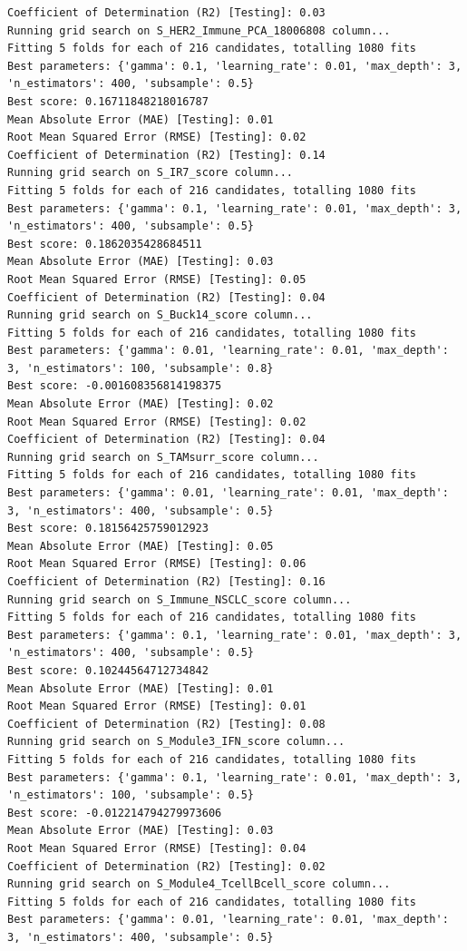 \documentclass[
  letterpaper,
  DIV=11,
  numbers=noendperiod]{scrartcl}
\begin{document}
\begin{verbatim}
Coefficient of Determination (R2) [Testing]: 0.03
Running grid search on S_HER2_Immune_PCA_18006808 column...
Fitting 5 folds for each of 216 candidates, totalling 1080 fits
Best parameters: {'gamma': 0.1, 'learning_rate': 0.01, 'max_depth': 3, 'n_estimators': 400, 'subsample': 0.5}
Best score: 0.16711848218016787
Mean Absolute Error (MAE) [Testing]: 0.01
Root Mean Squared Error (RMSE) [Testing]: 0.02
Coefficient of Determination (R2) [Testing]: 0.14
Running grid search on S_IR7_score column...
Fitting 5 folds for each of 216 candidates, totalling 1080 fits
Best parameters: {'gamma': 0.1, 'learning_rate': 0.01, 'max_depth': 3, 'n_estimators': 400, 'subsample': 0.5}
Best score: 0.1862035428684511
Mean Absolute Error (MAE) [Testing]: 0.03
Root Mean Squared Error (RMSE) [Testing]: 0.05
Coefficient of Determination (R2) [Testing]: 0.04
Running grid search on S_Buck14_score column...
Fitting 5 folds for each of 216 candidates, totalling 1080 fits
Best parameters: {'gamma': 0.01, 'learning_rate': 0.01, 'max_depth': 3, 'n_estimators': 100, 'subsample': 0.8}
Best score: -0.001608356814198375
Mean Absolute Error (MAE) [Testing]: 0.02
Root Mean Squared Error (RMSE) [Testing]: 0.02
Coefficient of Determination (R2) [Testing]: 0.04
Running grid search on S_TAMsurr_score column...
Fitting 5 folds for each of 216 candidates, totalling 1080 fits
Best parameters: {'gamma': 0.01, 'learning_rate': 0.01, 'max_depth': 3, 'n_estimators': 400, 'subsample': 0.5}
Best score: 0.18156425759012923
Mean Absolute Error (MAE) [Testing]: 0.05
Root Mean Squared Error (RMSE) [Testing]: 0.06
Coefficient of Determination (R2) [Testing]: 0.16
Running grid search on S_Immune_NSCLC_score column...
Fitting 5 folds for each of 216 candidates, totalling 1080 fits
Best parameters: {'gamma': 0.1, 'learning_rate': 0.01, 'max_depth': 3, 'n_estimators': 400, 'subsample': 0.5}
Best score: 0.10244564712734842
Mean Absolute Error (MAE) [Testing]: 0.01
Root Mean Squared Error (RMSE) [Testing]: 0.01
Coefficient of Determination (R2) [Testing]: 0.08
Running grid search on S_Module3_IFN_score column...
Fitting 5 folds for each of 216 candidates, totalling 1080 fits
Best parameters: {'gamma': 0.1, 'learning_rate': 0.01, 'max_depth': 3, 'n_estimators': 100, 'subsample': 0.5}
Best score: -0.012214794279973606
Mean Absolute Error (MAE) [Testing]: 0.03
Root Mean Squared Error (RMSE) [Testing]: 0.04
Coefficient of Determination (R2) [Testing]: 0.02
Running grid search on S_Module4_TcellBcell_score column...
Fitting 5 folds for each of 216 candidates, totalling 1080 fits
Best parameters: {'gamma': 0.01, 'learning_rate': 0.01, 'max_depth': 3, 'n_estimators': 400, 'subsample': 0.5}

\end{verbatim}
\end{document}
